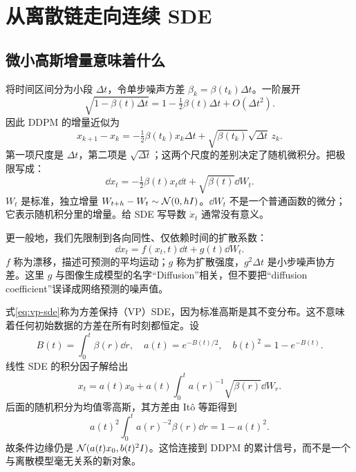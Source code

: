 \section{从离散链走向连续 SDE}\label{sec:sde}
\subsection{微小高斯增量意味着什么}
将时间区间分为小段 $\Delta t$，令单步噪声方差 $\beta_k=\beta(t_k)\Delta t$。一阶展开
\begin{equation}
 \sqrt{1-\beta(t)\Delta t}=1-\tfrac12\beta(t)\Delta t+O(\Delta t^2).
\end{equation}
因此 DDPM 的增量近似为
\begin{equation}
 x_{k+1}-x_k=-\tfrac12\beta(t_k)x_k\Delta t
 +\sqrt{\beta(t_k)}\sqrt{\Delta t}\,z_k.
\end{equation}
第一项尺度是 $\Delta t$，第二项是 $\sqrt{\Delta t}$；这两个尺度的差别决定了随机微积分。把极限写成：
\begin{equation}
 \dd x_t=-\tfrac12\beta(t)x_t\dd t+\sqrt{\beta(t)}\dd W_t.
 \label{eq:vp-sde}
\end{equation}
$W_t$ 是标准，独立增量 $W_{t+h}-W_t\sim\mathcal{N}(0,hI)$。$\dd W_t$ 不是一个普通函数的微分；它表示随机积分里的增量。给 SDE 写导数 $\dot x_t$ 通常没有意义。

更一般地，我们先限制到各向同性、仅依赖时间的扩散系数：
\begin{equation}
 \dd x_t=f(x_t,t)\dd t+g(t)\dd W_t.
 \label{eq:general-sde}
\end{equation}
$f$ 称为漂移，描述可预测的平均运动；$g$ 称为扩散强度，$g^2\Delta t$ 是小步噪声协方差。这里 $g$ 与图像生成模型的名字“Diffusion”相关，但不要把“diffusion coefficient”误译成网络预测的噪声值。

式\eqref{eq:vp-sde}称为方差保持（VP）SDE，因为标准高斯是其不变分布。这不意味着任何初始数据的方差在所有时刻都恒定。设
\begin{equation}
 B(t)=\int_0^t\beta(r)\dd r,\quad
 a(t)=e^{-B(t)/2},\quad b(t)^2=1-e^{-B(t)}.
\end{equation}
线性 SDE 的积分因子解给出
\begin{equation}
 x_t=a(t)x_0+a(t)\int_0^t a(r)^{-1}\sqrt{\beta(r)}\dd W_r.
\end{equation}
后面的随机积分为均值零高斯，其方差由 It\^o 等距得到
\begin{equation}
 a(t)^2\int_0^t a(r)^{-2}\beta(r)\dd r=1-a(t)^2.
\end{equation}
故条件边缘仍是 $\mathcal{N}(a(t)x_0,b(t)^2I)$。这恰连接到 DDPM 的累计信号，而不是一个与离散模型毫无关系的新对象。

